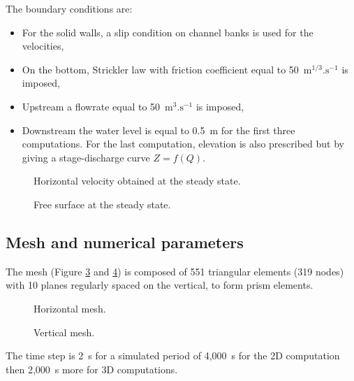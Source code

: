 \bigskip
The boundary conditions are:
\begin{itemize}
\item For the solid walls, a slip condition on channel banks is used for the velocities,
\item On the bottom, Strickler law with friction coefficient equal to
50~$\text{m}^{1/3}.\text{s}^{-1}$ is imposed,
\item Upstream a flowrate equal to 50~$\text{m}^{3}.\text{s}^{-1}$ is imposed,
\item Downstream the water level is equal to 0.5~m for the first three
computations.
For the last computation, elevation is also prescribed but by giving a
stage-discharge curve $Z = f(Q)$.
\end{itemize}
\begin{figure}[!htbp]
 \centering
 \caption{Horizontal velocity obtained at the steady state.}
 \label{t3d:canal:fig:veloH}
\end{figure}

\begin{figure}[!htbp]
 \centering
 \caption{Free surface at the steady state.}
 \label{t3d:canal:fig:freeSurface}
\end{figure}

\subsection{Mesh and numerical parameters}
\bigskip
The mesh (Figure \ref{t3d:canal:fig:meshH} and \ref{t3d:canal:fig:meshV})  
is composed of 551 triangular elements (319 nodes) with 10 planes  
regularly spaced on the vertical, to form prism elements.\\

\begin{figure}[!htbp]
 \centering
 \caption{Horizontal mesh.}
 \label{t3d:canal:fig:meshH}
\end{figure}
\begin{figure}[!htbp]
 \centering
 \caption{Vertical mesh.}
 \label{t3d:canal:fig:meshV}
\end{figure}


\bigskip
The time step is 2~s for a simulated period of 4,000~s for the 2D computation
then 2,000~s more for 3D computations.

